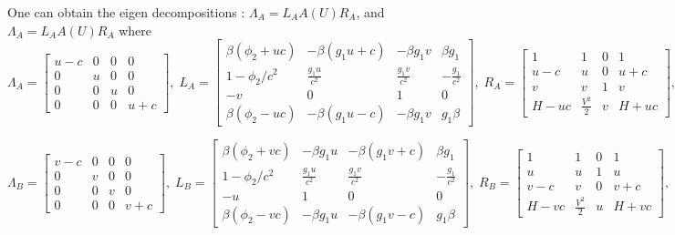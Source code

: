 \documentclass{article}
\begin{document}
One can obtain the eigen decompositions : $\Lambda_A = L_A A(U) R_A$, and $\Lambda_A = L_A A(U) R_A$ where
\begin{equation}
  \Lambda_A = \left[
    \begin{array}{cccc}
      u-c& 0 & 0 & 0\\
      0  & u & 0 & 0\\
      0  & 0 & u & 0\\
      0  & 0 & 0 & u+c
    \end{array}
  \right],\;
  L_A=\left[
    \begin{array}{cccc}
      \beta(\phi_2 + u c) & -\beta (g_1 u + c) & -\beta g_1 v & \beta g_1 \\
      1 - \phi_2/c^2     & \frac{g_1 u}{c^2}   & \frac{g_1 v}{c^2} & -\frac{g_1}{c^2}\\
      -v & 0 & 1 & 0\\
      \beta(\phi_2 - u c) & -\beta (g_1 u - c) & -\beta g_1 v & g_1 \beta
    \end{array}
  \right],\;
  R_A=\left[
    \begin{array}{cccc}
      1    & 1             & 0 & 1\\
      u-c  & u             & 0 & u+c\\
      v    & v             & 1 & v\\
      H-uc & \frac{V^2}{2} & v & H+uc
    \end{array}
  \right],
\end{equation}

\begin{equation}
  \Lambda_B = \left[
    \begin{array}{cccc}
      v-c& 0 & 0 & 0\\
      0  & v & 0 & 0\\
      0  & 0 & v & 0\\
      0  & 0 & 0 & v+c
    \end{array}
  \right],\;
  L_B=\left[
    \begin{array}{cccc}
      \beta(\phi_2 + v c) & -\beta g_1 u & -\beta (g_1 v + c) & \beta g_1 \\
      1 - \phi_2/c^2     & \frac{g_1 u}{c^2}   & \frac{g_1 v}{c^2} & -\frac{g_1}{c^2}\\
      -u & 1 & 0 & 0\\
      \beta(\phi_2 - v c) & -\beta g_1 u & -\beta (g_1 v - c) & g_1 \beta
    \end{array}
  \right],\;
  R_B=\left[
    \begin{array}{cccc}
      1    & 1             & 0 & 1\\
      u    & u             & 1 & u\\
      v-c  & v             & 0 & v+c\\
      H-vc & \frac{V^2}{2} & u & H+vc
    \end{array}
  \right],
\end{equation}
\end{document}
